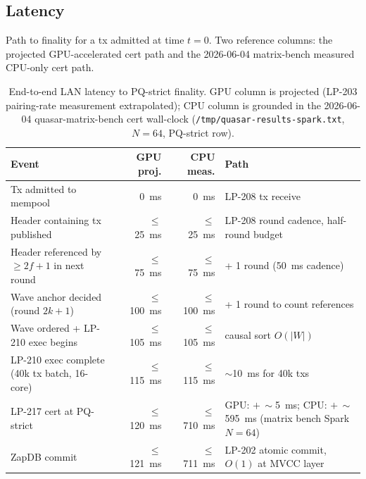 \subsection{Latency}

Path to finality for a tx admitted at time $t = 0$. Two reference
columns: the projected GPU-accelerated cert path and the
2026-06-04 matrix-bench measured CPU-only cert path.

\begin{table}[h]
\centering
\small
\begin{tabular}{@{}p{5.4cm}rrp{3.6cm}@{}}
\toprule
\textbf{Event} & \textbf{GPU proj.} & \textbf{CPU meas.} & \textbf{Path} \\
\midrule
Tx admitted to mempool & \SI{0}{\milli\second} & \SI{0}{\milli\second} & LP-208 tx receive \\
Header containing tx published & $\leq$~\SI{25}{\milli\second} & $\leq$~\SI{25}{\milli\second} & LP-208 round cadence, half-round budget \\
Header referenced by $\geq 2f{+}1$ in next round & $\leq$~\SI{75}{\milli\second} & $\leq$~\SI{75}{\milli\second} & + 1 round (\SI{50}{\milli\second} cadence) \\
Wave anchor decided (round $2k{+}1$) & $\leq$~\SI{100}{\milli\second} & $\leq$~\SI{100}{\milli\second} & + 1 round to count references \\
Wave ordered + LP-210 exec begins & $\leq$~\SI{105}{\milli\second} & $\leq$~\SI{105}{\milli\second} & causal sort $O(|W|)$ \\
LP-210 exec complete (40k tx batch, 16-core) & $\leq$~\SI{115}{\milli\second} & $\leq$~\SI{115}{\milli\second} & $\sim$\SI{10}{\milli\second} for 40k txs \\
LP-217 cert at PQ-strict & $\leq$~\SI{120}{\milli\second} & $\leq$~\SI{710}{\milli\second} & GPU: $+\,\sim$\SI{5}{\milli\second}; CPU: $+\,\sim$\SI{595}{\milli\second} (matrix bench Spark $N{=}64$) \\
ZapDB commit & $\leq$~\SI{121}{\milli\second} & $\leq$~\SI{711}{\milli\second} & LP-202 atomic commit, $O(1)$ at MVCC layer \\
\bottomrule
\end{tabular}
\caption{End-to-end LAN latency to PQ-strict finality. GPU column
is projected (LP-203 pairing-rate measurement extrapolated); CPU
column is grounded in the 2026-06-04 quasar-matrix-bench cert
wall-clock (\texttt{/tmp/quasar-results-spark.txt}, $N{=}64$,
PQ-strict row).}
\label{tab:latency}
\end{table}

